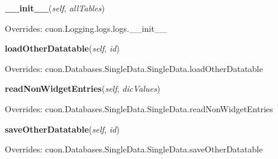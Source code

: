     \vspace{0.5ex}

\hspace{.8\funcindent}\begin{boxedminipage}{\funcwidth}

    \raggedright \textbf{\_\_init\_\_}(\textit{self}, \textit{allTables})

\setlength{\parskip}{2ex}
\setlength{\parskip}{1ex}
      Overrides: cuon.Logging.logs.logs.\_\_init\_\_

    \end{boxedminipage}

    \vspace{0.5ex}

\hspace{.8\funcindent}\begin{boxedminipage}{\funcwidth}

    \raggedright \textbf{loadOtherDatatable}(\textit{self}, \textit{id})

\setlength{\parskip}{2ex}
\setlength{\parskip}{1ex}
      Overrides: cuon.Databases.SingleData.SingleData.loadOtherDatatable

    \end{boxedminipage}

    \vspace{0.5ex}

\hspace{.8\funcindent}\begin{boxedminipage}{\funcwidth}

    \raggedright \textbf{readNonWidgetEntries}(\textit{self}, \textit{dicValues})

\setlength{\parskip}{2ex}
\setlength{\parskip}{1ex}
      Overrides: cuon.Databases.SingleData.SingleData.readNonWidgetEntries

    \end{boxedminipage}

    \vspace{0.5ex}

\hspace{.8\funcindent}\begin{boxedminipage}{\funcwidth}

    \raggedright \textbf{saveOtherDatatable}(\textit{self}, \textit{id})

\setlength{\parskip}{2ex}
\setlength{\parskip}{1ex}
      Overrides: cuon.Databases.SingleData.SingleData.saveOtherDatatable

    \end{boxedminipage}


